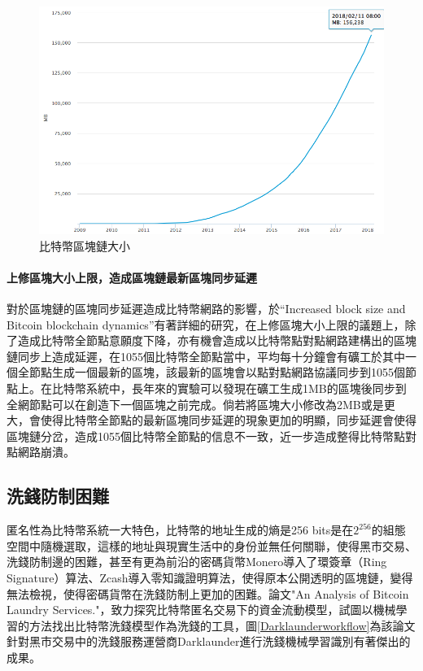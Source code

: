 			\begin{figure}[h]
				\centering
				\includegraphics[width = .7\textwidth]{blockchainsize.png}
				\caption{比特幣區塊鏈大小\supercite{blockchainsize}}\label{blockchainsize}
			\end{figure}

			\paragraph{上修區塊大小上限，造成區塊鏈最新區塊同步延遲}
			對於區塊鏈的區塊同步延遲造成比特幣網路的影響，於“Increased block size and Bitcoin blockchain dynamics”\supercite{TelecommunicationNetworksandApplicationsConferenceITNAC201727thInternational}有著詳細的研究，在上修區塊大小上限的議題上，除了造成比特幣全節點意願度下降，亦有機會造成以比特幣點對點網路建構出的區塊鏈同步上造成延遲，在1055個比特幣全節點當中，平均每十分鐘會有礦工於其中一個全節點生成一個最新的區塊，該最新的區塊會以點對點網路協議同步到1055個節點上。在比特幣系統中，長年來的實驗可以發現在礦工生成1MB的區塊後同步到全網節點可以在創造下一個區塊之前完成。倘若將區塊大小修改為2MB或是更大，會使得比特幣全節點的最新區塊同步延遲的現象更加的明顯，同步延遲會使得區塊鏈分岔，造成1055個比特幣全節點的信息不一致，近一步造成整得比特幣點對點網路崩潰。

		\subsection{洗錢防制困難}
		匿名性為比特幣系統一大特色，比特幣的地址生成的熵是256 bits是在$2^{256}$的組態空間中隨機選取，這樣的地址與現實生活中的身份並無任何關聯，使得黑市交易、洗錢防制邊的困難，甚至有更為前沿的密碼貨幣Monero\supercite{noether2014monero}導入了環簽章（Ring Signature）\supercite{Thresholdringsignaturesandapplicationstoad-hocgroups}算法、Zcash\supercite{zhong2002faster}導入零知識證明算法\supercite{Zero-KnowledgeProofsofIdentity}，使得原本公開透明的區塊鏈，變得無法檢視，使得密碼貨幣在洗錢防制上更加的困難。論文"An Analysis of Bitcoin Laundry Services."\supercite{AnAnalysisofBitcoinLaundryServices}，致力探究比特幣匿名交易下的資金流動模型，試圖以機械學習的方法找出比特幣洗錢模型作為洗錢的工具，圖\ref{Darklaunderworkflow}為該論文針對黑市交易中的洗錢服務運營商Darklaunder進行洗錢機械學習識別有著傑出的成果。

